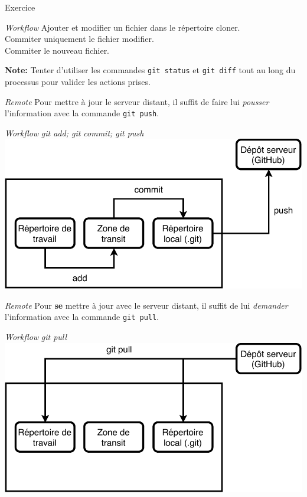 \documentclass[11pt]{beamer}
\begin{document}
\begin{frame}[fragile]{Exercice}
	\begin{block}{\textit{Workflow}}
		Ajouter et modifier un fichier dans le répertoire cloner. \\
		Commiter uniquement le fichier modifier. \\
		Commiter le nouveau fichier.  \\
	\end{block}
	\textbf{Note:} Tenter d'utiliser les commandes \verb|git status| et \verb|git diff| tout au long du processus pour valider les actions prises.
\end{frame}

\begin{frame}[fragile]{\textit{Remote}}
	Pour mettre à jour le serveur distant, il suffit de faire lui \textit{pousser} l'information avec la commande \verb|git push|.
\end{frame}

\begin{frame}{\textit{Workflow} \textit{git add; git commit; git push}}
	\includegraphics[width=0.95\linewidth,height=0.95\textheight,keepaspectratio]{workflow.pdf}
\end{frame}

\begin{frame}[fragile]{\textit{Remote}}
	Pour \textbf{se} mettre à jour avec le serveur distant, il suffit de lui \textit{demander} l'information avec la commande \verb|git pull|.
\end{frame}

\begin{frame}{\textit{Workflow} \textit{git pull}}
	\includegraphics[width=0.95\linewidth,height=0.95\textheight,keepaspectratio]{pull.pdf}
\end{frame}
\end{document}
